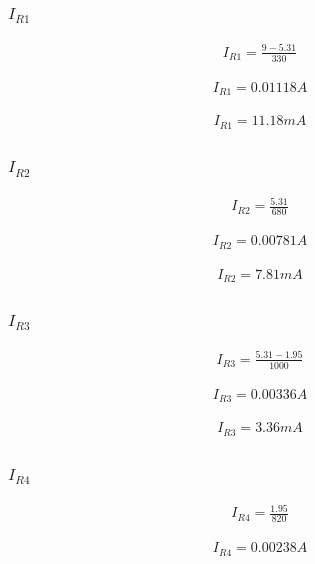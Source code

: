 \documentclass[conference]{IEEEtran}
\begin{document}
\subsubsection{$I_{R1}$}

\begin{align*}
I_{R1}=\frac{9-5.31}{330}
\end{align*}

\begin{align*}
I_{R1}=0.01118A
\end{align*}

\begin{align*}
I_{R1}=11.18mA
\end{align*}

\subsubsection{$I_{R2}$}

\begin{align*}
I_{R2}=\frac{5.31}{680}
\end{align*}

\begin{align*}
I_{R2}=0.00781A
\end{align*}

\begin{align*}
I_{R2}=7.81mA
\end{align*}

\subsubsection{$I_{R3}$}

\begin{align*}
I_{R3}=\frac{5.31-1.95}{1000}
\end{align*}

\begin{align*}
I_{R3}=0.00336A
\end{align*}

\begin{align*}
I_{R3}=3.36mA
\end{align*}

\subsubsection{$I_{R4}$}

\begin{align*}
I_{R4}=\frac{1.95}{820}
\end{align*}

\begin{align*}
I_{R4}=0.00238A
\end{align*}
\end{document}
